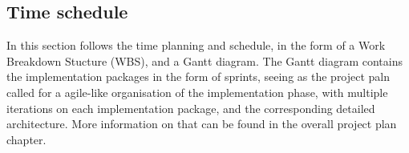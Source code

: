 \subsection{Time schedule}
In this section follows the time planning and schedule, in the form of a Work Breakdown Stucture (WBS), and a Gantt diagram.
The Gantt diagram contains the implementation packages in the form of sprints, seeing as the project paln called for a agile-like organisation of the implementation phase, with multiple iterations on each implementation package, and the corresponding detailed architecture. More information on that can be found in the overall project plan chapter.
